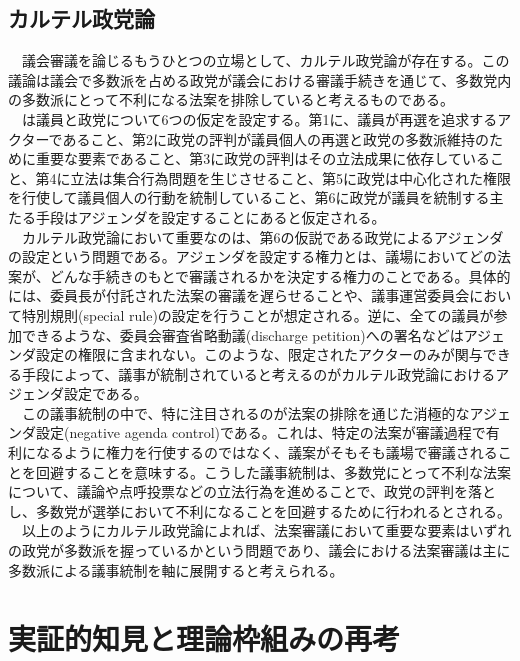 \documentclass{article}
\begin{document}
\subsection{カルテル政党論}
　議会審議を論じるもうひとつの立場として、カルテル政党論\citep*{Cox2005-pn,Cox2007-xq}が存在する。この議論は議会で多数派を占める政党が議会における審議手続きを通じて、多数党内の多数派にとって不利になる法案を排除していると考えるものである。\\
　\citet*{Cox2005-pn,Cox2007-xq}は議員と政党について6つの仮定を設定する。第1に、議員が再選を追求するアクターであること、第2に政党の評判が議員個人の再選と政党の多数派維持のために重要な要素であること、第3に政党の評判はその立法成果に依存していること、第4に立法は集合行為問題を生じさせること、第5に政党は中心化された権限を行使して議員個人の行動を統制していること、第6に政党が議員を統制する主たる手段はアジェンダを設定することにあると仮定される。\\
　カルテル政党論において重要なのは、第6の仮説である政党によるアジェンダの設定という問題である。アジェンダを設定する権力とは、議場においてどの法案が、どんな手続きのもとで審議されるかを決定する権力のことである。具体的には、委員長が付託された法案の審議を遅らせることや、議事運営委員会において特別規則(special rule)の設定を行うことが想定される。逆に、全ての議員が参加できるような、委員会審査省略動議(discharge petition)への署名などはアジェンダ設定の権限に含まれない。このような、限定されたアクターのみが関与できる手段によって、議事が統制されていると考えるのがカルテル政党論におけるアジェンダ設定である。\\
　この議事統制の中で、特に注目されるのが法案の排除を通じた消極的なアジェンダ設定(negative agenda control)である。これは、特定の法案が審議過程で有利になるように権力を行使するのではなく、議案がそもそも議場で審議されることを回避することを意味する。こうした議事統制は、多数党にとって不利な法案について、議論や点呼投票などの立法行為を進めることで、政党の評判を落とし、多数党が選挙において不利になることを回避するために行われるとされる。\\
　以上のようにカルテル政党論によれば、法案審議において重要な要素はいずれの政党が多数派を握っているかという問題であり、議会における法案審議は主に多数派による議事統制を軸に展開すると考えられる。

\section{実証的知見と理論枠組みの再考}
\end{document}
